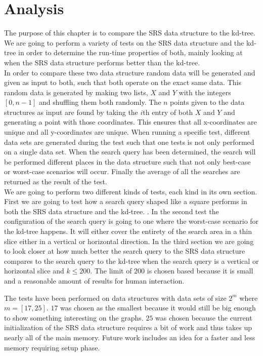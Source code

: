 \chapter{Analysis}
The purpose of this chapter is to compare the SRS data structure to the kd-tree. We are going to perform a variety of tests on the SRS data structure and the kd-tree in order to determine the run-time properties of both, mainly looking at when the SRS data structure performs better than the kd-tree.\\


In order to compare these two data structure random data will be generated and given as input to both, such that both operate on the exact same data. This random data is generated by making two lists, $X$ and $Y$ with the integers $[0,n-1]$ and shuffling them both randomly. The $n$ points given to the data structures as input are found by taking the $i$th entry of both $X$ and $Y$ and generating a point with those coordinates. This ensures that all x-coordinates are unique and all y-coordinates are unique.  When running a specific test, different data sets are generated during the test such that one tests is not only performed on a single data set. When the search query has been determined, the search will be performed different places in the data structure such that not only best-case or worst-case scenarios will occur. Finally the average of all the searches are returned as the result of the test.\\

We are going to perform two different kinds of tests, each kind in its own section. First we are going to test how a search query shaped like a square performs in both the SRS data structure and the kd-tree. . In the second test the configuration of the search query is going to one where the worst-case scenario for the kd-tree happens. It will either cover the entirety of the search area in a thin slice either in a vertical or horizontal direction. In the third section we are going to look closer at how much better the search query to the SRS data structure compares to the search query to the kd-tree when the search query is a vertical or horizontal slice and $k \leq 200$. The limit of $200$ is chosen based because it is small and a reasonable amount of results for human interaction.

The tests have been performed on data structures with data sets of size $2^m$ where $m = [17,25]$. $17$ was chosen as the smallest because it would still be big enough to show something interesting on the graphs. $25$ was chosen because the current initialization of the SRS data structure requires a bit of work and thus takes up nearly all of the main memory. Future work includes an idea for a faster and less memory requiring setup phase.


